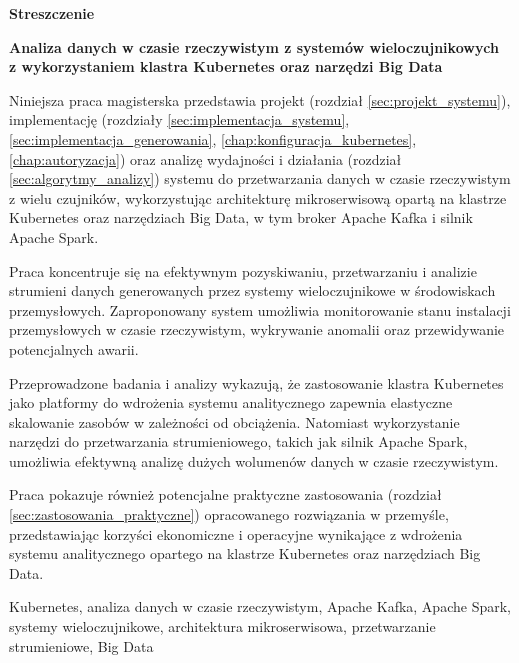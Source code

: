 \begin{abstract_pl}
\begin{center}
\textbf{\large Streszczenie}
\end{center}

\begin{center}
 \textbf{Analiza danych w czasie rzeczywistym z systemów wieloczujnikowych \\ z wykorzystaniem klastra Kubernetes oraz narzędzi Big Data}\\
\end{center}

Niniejsza praca magisterska przedstawia projekt (rozdział \ref{sec:projekt_systemu}), implementację (rozdziały \ref{sec:implementacja_systemu}, \ref{sec:implementacja_generowania}, \ref{chap:konfiguracja_kubernetes}, \ref{chap:autoryzacja}) oraz analizę wydajności i działania (rozdział \ref{sec:algorytmy_analizy}) systemu do przetwarzania danych w czasie rzeczywistym z wielu czujników, wykorzystując architekturę mikroserwisową opartą na klastrze Kubernetes oraz narzędziach Big Data, w tym broker Apache Kafka i silnik Apache Spark.

Praca koncentruje się na efektywnym pozyskiwaniu, przetwarzaniu i analizie strumieni danych generowanych przez systemy wieloczujnikowe w środowiskach przemysłowych. Zaproponowany system umożliwia monitorowanie stanu instalacji przemysłowych w czasie rzeczywistym, wykrywanie anomalii oraz przewidywanie potencjalnych awarii.

Przeprowadzone badania i analizy wykazują, że zastosowanie klastra Kubernetes jako platformy do wdrożenia systemu analitycznego zapewnia elastyczne skalowanie zasobów w zależności od obciążenia. Natomiast wykorzystanie narzędzi do przetwarzania strumieniowego, takich jak silnik Apache Spark, umożliwia efektywną analizę dużych wolumenów danych w czasie rzeczywistym.

Praca pokazuje również potencjalne praktyczne zastosowania (rozdział \ref{sec:zastosowania_praktyczne}) opracowanego rozwiązania w przemyśle, przedstawiając korzyści ekonomiczne i operacyjne wynikające z wdrożenia systemu analitycznego opartego na klastrze Kubernetes oraz narzędziach Big Data.

\begin{keywords}
Kubernetes, analiza danych w czasie rzeczywistym, Apache Kafka, Apache Spark, systemy wieloczujnikowe, architektura mikroserwisowa, przetwarzanie strumieniowe, Big Data
\end{keywords}
\end{abstract_pl}